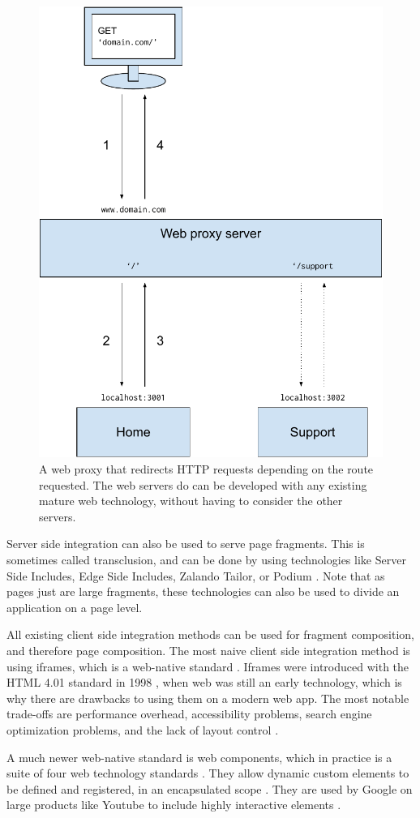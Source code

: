 \begin{figure}
    \centering
    \includegraphics[width=0.5\linewidth]{images/web-proxy.pdf}
    \caption{A web proxy that redirects HTTP requests depending on the route requested. The web servers do can be developed with any existing mature web technology, without having to consider the other servers.}
    \label{fig:web-proxy-example}
\end{figure}

Server side integration can also be used to serve page fragments. This is sometimes called transclusion, and can be done by using technologies like Server Side Includes, Edge Side Includes, Zalando Tailor, or Podium \cite[ch.~4]{Geers2020}. Note that as pages just are large fragments, these technologies can also be used to divide an application on a page level.

All existing client side integration methods can be used for fragment composition, and therefore page composition. The most naive client side integration method is using iframes, which is a web-native standard \cite[ch.~2]{Geers2020}. Iframes were introduced with the HTML 4.01 standard in 1998 \cite{Raggett1999}, when web was still an early technology, which is why there are drawbacks to using them on a modern web app. The most notable trade-offs are performance overhead, accessibility problems, search engine optimization problems, and the lack of layout control \cite[ch.~2]{Geers2020}.

A much newer web-native standard is web components, which in practice is a suite of four web technology standards \cite{MDNWebDocs}. They allow dynamic custom elements to be defined and registered, in an encapsulated scope \cite{MDNWebDocs}. They are used by Google on large products like Youtube to include highly interactive elements \cite{ThePolymerProjectc}.

